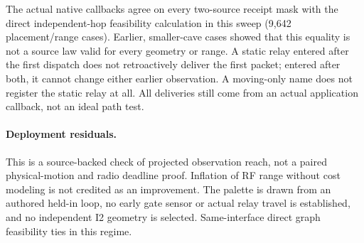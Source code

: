 \documentclass{article}
\begin{document}
The actual native callbacks agree on every two-source receipt mask
with the direct independent-hop feasibility calculation in this
sweep (9,642 placement/range cases). Earlier, smaller-cave cases
showed that this equality is not a source law valid for every
geometry or range. A static relay entered after the first dispatch
does not retroactively deliver the first packet; entered after both,
it cannot change either earlier observation. A moving-only name
does not register the static relay at all. All deliveries still
come from an actual application callback, not an ideal path test.

\paragraph{Deployment residuals.}
This is a source-backed check of projected observation reach, not
a paired physical-motion and radio deadline proof. Inflation of
RF range without cost modeling is not credited as an improvement.
The palette is drawn from an authored held-in loop, no early gate
sensor or actual relay travel is established, and no independent
I2 geometry is selected. Same-interface direct graph feasibility
ties in this regime.
\end{document}

